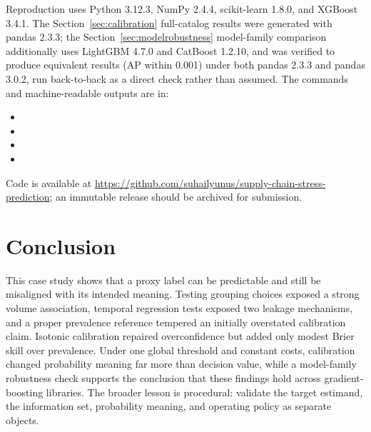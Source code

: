 \documentclass[11pt]{article}
\begin{document}
Reproduction uses Python 3.12.3, NumPy 2.4.4, scikit-learn 1.8.0, and XGBoost 3.4.1. The Section~\ref{sec:calibration} full-catalog results were generated with pandas 2.3.3; the Section~\ref{sec:modelrobustness} model-family comparison additionally uses LightGBM 4.7.0 and CatBoost 1.2.10, and was verified to produce equivalent results (AP within 0.001) under both pandas 2.3.3 and pandas 3.0.2, run back-to-back as a direct check rather than assumed. The commands and machine-readable outputs are in:
\begin{itemize}[nosep,leftmargin=*]
    \item {}
    \item {}
    \item {}
    \item {}
\end{itemize}
Code is available at \url{https://github.com/suhailyunus/supply-chain-stress-prediction}; an immutable release should be archived for submission.

\section{Conclusion}

This case study shows that a proxy label can be predictable and still be misaligned with its intended meaning. Testing grouping choices exposed a strong volume association, temporal regression tests exposed two leakage mechanisms, and a proper prevalence reference tempered an initially overstated calibration claim. Isotonic calibration repaired overconfidence but added only modest Brier skill over prevalence. Under one global threshold and constant costs, calibration changed probability meaning far more than decision value, while a model-family robustness check supports the conclusion that these findings hold across gradient-boosting libraries. The broader lesson is procedural: validate the target estimand, the information set, probability meaning, and operating policy as separate objects.
\end{document}
